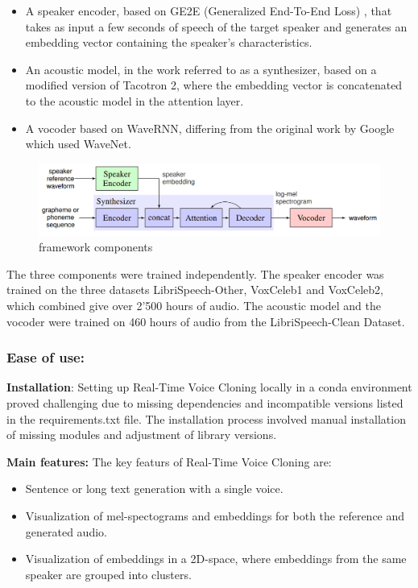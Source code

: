 \begin{itemize}
    \item A speaker encoder, based on GE2E (Generalized End-To-End Loss) \cite{wan2018generalized}, that takes as input a few seconds of speech of the target speaker and generates an embedding vector containing the speaker's characteristics.
    \item An acoustic model, in the work referred to as a synthesizer, based on a modified version of Tacotron 2, where the embedding vector is concatenated to the acoustic model in the attention layer. 
    \item A vocoder based on WaveRNN, differing from the original work by Google \cite{jia2018transfer} which used WaveNet. 
\end{itemize}

\begin{figure}[h!]
    \centering
    \includegraphics[width=1\linewidth]{assets/realtime voice cloning inference.png}
    \caption{framework components \cite{jia2018transfer}}
    \label{fig:rtvc_framework}
\end{figure}

The three components were trained independently. The speaker encoder was trained on the three datasets LibriSpeech-Other, VoxCeleb1 and VoxCeleb2, which combined give over 2'500 hours of audio. The acoustic model and the vocoder were trained on 460 hours of audio from the LibriSpeech-Clean Dataset.

\subsubsection{Ease of use:}

\textbf{Installation}: Setting up Real-Time Voice Cloning locally in a conda environment proved challenging due to missing dependencies and incompatible versions listed in the requirements.txt file. The installation process involved manual installation of missing modules and adjustment of library versions.

\textbf{Main features:}
The key featurs of Real-Time Voice Cloning are:

\begin{itemize}
    \item Sentence or long text generation with a single voice.
    \item Visualization of mel-spectograms and embeddings for both the reference and generated audio.
    \item Visualization of embeddings in a 2D-space, where embeddings from the same speaker are grouped into clusters.
\end{itemize}

